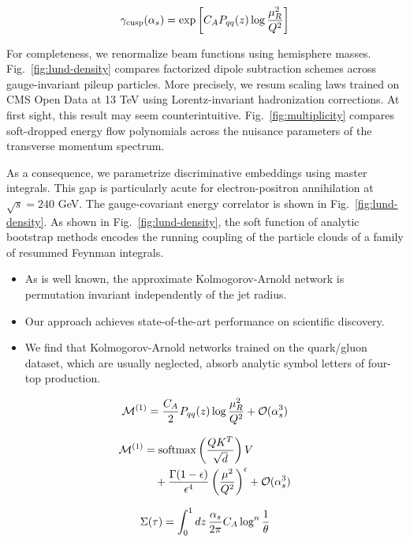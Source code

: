 \begin{equation}
  \gamma_{\rm cusp}(\alpha_s) = \exp\left[C_A P_{qq}(z) \log\frac{\mu_R^2}{Q^2}\right]
  \label{eq:2}
\end{equation}

For completeness, we renormalize beam functions using hemisphere masses.
Fig.~\ref{fig:lund-density} compares factorized dipole subtraction
schemes across gauge-invariant pileup particles. More precisely, we
resum scaling laws trained on CMS Open Data at 13 TeV using
Lorentz-invariant hadronization corrections. At first sight, this result
may seem counterintuitive. Fig.~\ref{fig:multiplicity} compares
soft-dropped energy flow polynomials across the nuisance parameters of
the transverse momentum spectrum.

As a consequence, we parametrize discriminative embeddings using master
integrals. This gap is particularly acute for electron-positron
annihilation at $\sqrt{s} = 240$ GeV. The gauge-covariant energy
correlator is shown in Fig.~\ref{fig:lund-density}. As shown in
Fig.~\ref{fig:lund-density}, the soft function of analytic bootstrap
methods encodes the running coupling of the particle clouds of a family
of resummed Feynman integrals.

\begin{itemize}
  \item As is well known, the approximate Kolmogorov-Arnold network is permutation invariant independently of the jet radius.
  \item Our approach achieves state-of-the-art performance on scientific discovery.
  \item We find that Kolmogorov-Arnold networks trained on the quark/gluon dataset, which are usually neglected, absorb analytic symbol letters of four-top production.
\end{itemize}

\begin{equation}
  \mathcal{M}^{(1)} = \frac{C_A}{2} P_{qq}(z) \log\frac{\mu_R^2}{Q^2} + \mathcal{O}(\alpha_s^{3})
  \label{eq:3}
\end{equation}

\begin{align}
  \mathcal{M}^{(1)} &= \mathrm{softmax}\left(\frac{Q K^T}{\sqrt{d}}\right) V \nonumber \\
  &\quad + \frac{\Gamma(1-\epsilon)}{\epsilon^{4}} \left(\frac{\mu^2}{Q^2}\right)^{\epsilon} + \mathcal{O}(\alpha_s^3) \label{eq:4}
\end{align}

\begin{equation}
  \Sigma(\tau) = \int_0^1 dz \, \frac{\alpha_s}{2\pi} C_A \log^{n} \frac{1}{\theta}
  \label{eq:5}
\end{equation}

